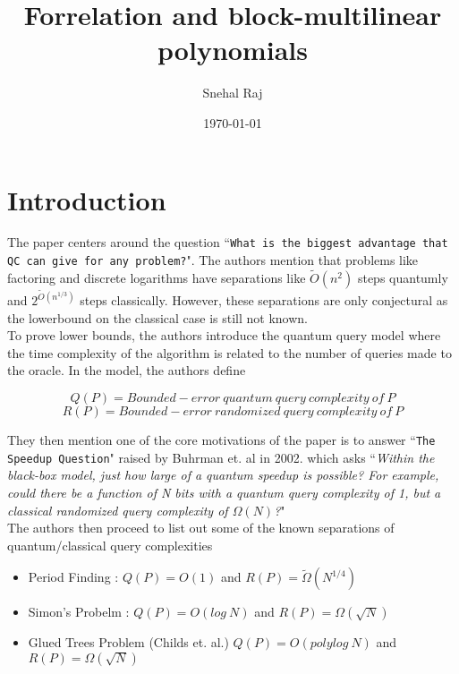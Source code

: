 \documentclass{article}
\title{Forrelation and block-multilinear polynomials}
\author{Snehal Raj}
\date{\today}
\begin{document}
\maketitle
\section{Introduction}
The paper centers around the question 	``\texttt{What is the biggest advantage that QC can give for any problem?}". The authors mention that problems like factoring and discrete logarithms have separations like $\widetilde{O}\left(n^{2}\right)$ steps quantumly and  $2^{\widetilde{O}\left(n^{1 / 3}\right)}$ steps classically. However, these separations are only conjectural as the lowerbound on the classical case is still not known.\\

 To prove lower bounds, the authors introduce the quantum query model where the time complexity of the algorithm is related to the number of queries made to the oracle. In the model, the authors define 

$$Q(P)=Bounded-error~quantum~query~ complexity~ of~ P$$  
$$R(P)=Bounded-error~ randomized~ query~ complexity ~of~ P$$

They then mention one of the core motivations of the paper is to answer ``\texttt{The Speedup Question}" raised by Buhrman et. al in 2002. which asks ``\textit{Within the black-box model, just how large of a quantum speedup is possible? For example, could there be a function of N bits with a quantum query complexity of 1, but a classical randomized query complexity of $\Omega(N)$?}"\\	



The authors then proceed to list out some of the known separations of quantum/classical query complexities
\begin{itemize}
\item Period Finding : $Q(P)= O(1)$ and $R(P) = \widetilde{\Omega}\left(N^{1 / 4}\right)$
\item Simon's Probelm : $Q(P) = O(log ~N)$ and $R(P) = \Omega(\sqrt{N})$
\item Glued Trees Problem (Childs et. al.) $Q(P) = O(polylog~ N)$ and $R(P) = \Omega(\sqrt{N})$
\end{itemize}
\end{document}
